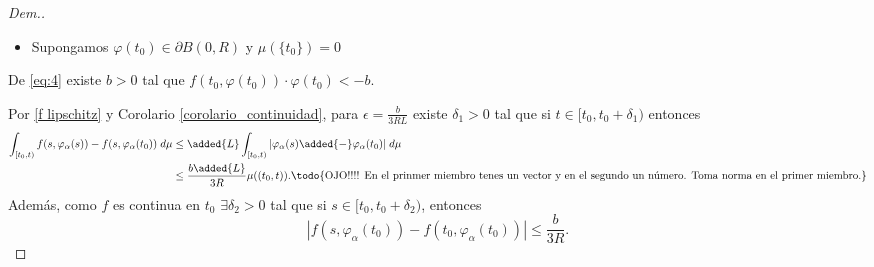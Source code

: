 \begin{proof}[Dem.]
    
\begin{itemize}
\item Supongamos $\varphi(t_0)\in \partial B(0,R)$ y $\mu(\{t_0\})= 0$ 
\end{itemize}
De \eqref{eq:4} existe $b>0$ tal que $f(t_0,\varphi(t_0))\cdot\varphi(t_0)<-b$.

Por \eqref{f lipschitz} y Corolario \ref{corolario_continuidad}, para $\epsilon=\frac{b}{3RL}$ existe $\delta_1>0$ tal que si $t\in[t_0,t_0+\delta_1)$ entonces
\begin{equation}
    \begin{split}
         \int_{[t_0,t)} f(s,\varphi_\alpha(s))-f(s,\varphi_\alpha(t_0))\; d\mu& \leq \added{L} \int_{[t_0,t)} |\varphi_\alpha(s)\added{-}\varphi_\alpha(t_0)|\; d\mu \\ &\leq \frac{b\added{L} }{3R}\mu((t_0,t)). \textrm{\todo{OJO!!!!  En el prinmer miembro tenes un vector y en el segundo un número. Toma norma en el primer miembro.}}
     \end{split}\label{eq:A}
\end{equation}
Además, como $f$ es continua en $t_0$ $\exists \delta_2>0 $ tal que si $s\in [t_0,t_0+\delta_2)$, entonces
\begin{equation}
    |f(s,\varphi_\alpha(t_0))-f(t_0,\varphi_\alpha(t_0))|\leq \frac{b}{3R}.\label{eq:B}
\end{equation}


\end{proof}
